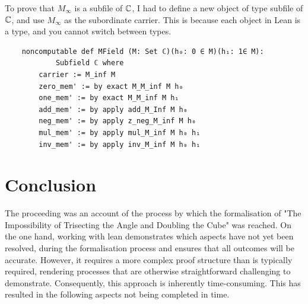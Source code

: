 To prove that $M_{\infty}$ is a subfile of $\mathbb{C}$, I had to define a new object of type subfile of $\mathbb{C}$, and use $M_{\infty}$ as the subordinate carrier.
This is because each object in Lean is a type, and you cannot switch between types.
\begin{lstlisting}
    noncomputable def MField (M: Set ℂ)(h₀: 0 ∈ M)(h₁: 1∈ M):
            Subfield ℂ where
        carrier := M_inf M
        zero_mem' := by exact M_M_inf M h₀
        one_mem' := by exact M_M_inf M h₁
        add_mem' := by apply add_M_Inf M h₀
        neg_mem' := by apply z_neg_M_inf M h₀
        mul_mem' := by apply mul_M_inf M h₀ h₁
        inv_mem' := by apply inv_M_inf M h₀ h₁
\end{lstlisting}

\section{Conclusion}
The proceeding was an account of the process by which the formalisation of "The Impossibility of Trisecting the Angle and Doubling the Cube" was reached. 
On the one hand, working with lean demonstrates which aspects have not yet been resolved, during the formalisation process and ensures that all outcomes will be accurate. 
However, it requires a more complex proof structure  than is typically required, rendering processes that are otherwise straightforward challenging to demonstrate.
Consequently, this approach is inherently time-consuming. 
This has resulted in the following aspects not being completed in time.